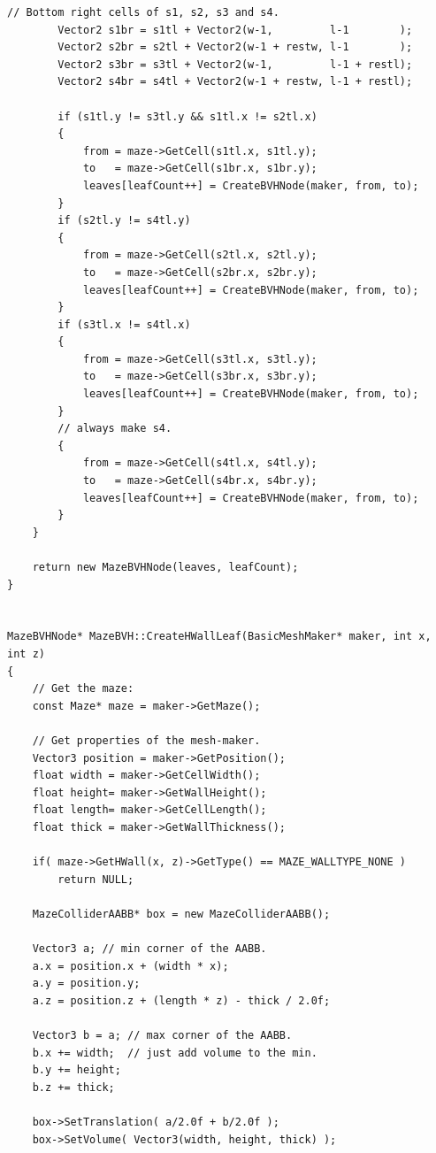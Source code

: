 \begin{lstlisting}[caption=The \texttt{MazeBVH} class]
        // Bottom right cells of s1, s2, s3 and s4.
        Vector2 s1br = s1tl + Vector2(w-1,         l-1        );
        Vector2 s2br = s2tl + Vector2(w-1 + restw, l-1        );
        Vector2 s3br = s3tl + Vector2(w-1,         l-1 + restl);
        Vector2 s4br = s4tl + Vector2(w-1 + restw, l-1 + restl);
        
        if (s1tl.y != s3tl.y && s1tl.x != s2tl.x)
        {
            from = maze->GetCell(s1tl.x, s1tl.y);
            to   = maze->GetCell(s1br.x, s1br.y);
            leaves[leafCount++] = CreateBVHNode(maker, from, to);
        }
        if (s2tl.y != s4tl.y)
        {
            from = maze->GetCell(s2tl.x, s2tl.y);
            to   = maze->GetCell(s2br.x, s2br.y);
            leaves[leafCount++] = CreateBVHNode(maker, from, to);
        }
        if (s3tl.x != s4tl.x)
        {
            from = maze->GetCell(s3tl.x, s3tl.y);
            to   = maze->GetCell(s3br.x, s3br.y);
            leaves[leafCount++] = CreateBVHNode(maker, from, to);
        }
        // always make s4.
        {
            from = maze->GetCell(s4tl.x, s4tl.y);
            to   = maze->GetCell(s4br.x, s4br.y);
            leaves[leafCount++] = CreateBVHNode(maker, from, to);
        }
    }
    
    return new MazeBVHNode(leaves, leafCount);
}


MazeBVHNode* MazeBVH::CreateHWallLeaf(BasicMeshMaker* maker, int x, int z)
{
    // Get the maze:
    const Maze* maze = maker->GetMaze();
    
    // Get properties of the mesh-maker.
    Vector3 position = maker->GetPosition();
    float width = maker->GetCellWidth();
    float height= maker->GetWallHeight();
    float length= maker->GetCellLength();
    float thick = maker->GetWallThickness();
    
    if( maze->GetHWall(x, z)->GetType() == MAZE_WALLTYPE_NONE )
        return NULL;
    
    MazeColliderAABB* box = new MazeColliderAABB();
    
    Vector3 a; // min corner of the AABB.
    a.x = position.x + (width * x);
    a.y = position.y;
    a.z = position.z + (length * z) - thick / 2.0f;
    
    Vector3 b = a; // max corner of the AABB.
    b.x += width;  // just add volume to the min.
    b.y += height;
    b.z += thick;
    
    box->SetTranslation( a/2.0f + b/2.0f );
    box->SetVolume( Vector3(width, height, thick) );
    

\end{lstlisting}
